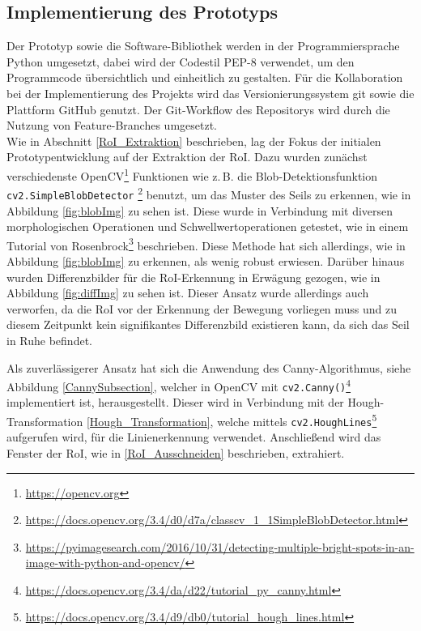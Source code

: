 \documentclass[10pt,a4paper]{scrarticle}
\begin{document}
\subsection{Implementierung des Prototyps}
Der Prototyp sowie die Software-Bibliothek werden in der Programmiersprache Python umgesetzt, dabei wird der Codestil PEP-8 verwendet, um den Programmcode übersichtlich und einheitlich zu gestalten.
Für die Kollaboration bei der Implementierung des Projekts wird das Versionierungssystem git sowie die Plattform GitHub genutzt. Der Git-Workflow des Repositorys wird durch die Nutzung von Feature-Branches umgesetzt. \\
Wie in Abschnitt \ref{RoI_Extraktion} beschrieben, lag der Fokus der initialen Prototypentwicklung auf der Extraktion der RoI. Dazu wurden zunächst verschiedenste OpenCV\footnote{\url{https://opencv.org}} Funktionen
wie z.\,B. die Blob-Detektionsfunktion  \texttt{cv2.SimpleBlobDetector} \footnote{\url{https://docs.opencv.org/3.4/d0/d7a/classcv_1_1SimpleBlobDetector.html}} benutzt, um das Muster des Seils zu erkennen, wie in Abbildung \ref{fig:blobImg} zu sehen ist.
Diese wurde in Verbindung mit diversen morphologischen Operationen und Schwellwertoperationen getestet, wie in einem Tutorial von Rosenbrock\footnote{\url{https://pyimagesearch.com/2016/10/31/detecting-multiple-bright-spots-in-an-image-with-python-and-opencv/}} beschrieben. Diese Methode hat sich allerdings, wie in Abbildung \ref{fig:blobImg} zu erkennen, als wenig robust erwiesen. 
Darüber hinaus wurden Differenzbilder für die RoI-Erkennung in Erwägung gezogen, wie in Abbildung \ref{fig:diffImg} zu sehen ist. Dieser Ansatz wurde allerdings auch verworfen, da die RoI vor der Erkennung der Bewegung vorliegen muss und zu diesem Zeitpunkt kein signifikantes Differenzbild existieren kann, da sich das Seil in Ruhe befindet.    

Als zuverlässigerer Ansatz hat sich die Anwendung des Canny-Algorithmus, siehe Abbildung \ref{CannySubsection}, welcher in OpenCV mit  \texttt{cv2.Canny()}\footnote{\url{https://docs.opencv.org/3.4/da/d22/tutorial_py_canny.html}} implementiert ist, herausgestellt.
Dieser wird in Verbindung mit der Hough-Transformation \ref{Hough_Transformation}, welche mittels  \texttt{cv2.HoughLines}\footnote{\url{https://docs.opencv.org/3.4/d9/db0/tutorial_hough_lines.html}} aufgerufen wird, für die Linienerkennung verwendet.
Anschließend wird das Fenster der RoI, wie in \ref{RoI_Ausschneiden} beschrieben, extrahiert. 
\end{document}

